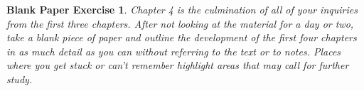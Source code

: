 \documentclass[11pt,leqno]{article}
\newtheorem{bpe}[thm]{Blank Paper Exercise}
\theoremstyle{definition}
\begin{document}
\begin{bpe}
Chapter 4 is the culmination of all of your inquiries from the first
three chapters. After not looking at the material for a day or two,
take a blank piece of paper and outline the development of the first
four chapters in as much detail as you can without referring to the
text or to notes. Places where you get stuck or can't remember
highlight areas that may call for further study.
\end{bpe}

\end{document}
